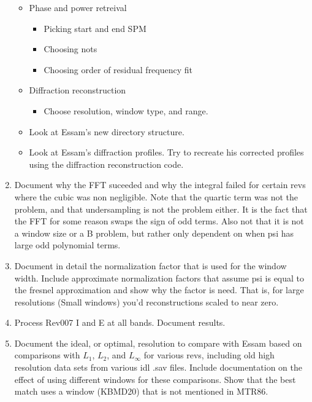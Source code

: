 \documentclass[crop=false,class=article,oneside]{standalone}
\begin{document}
\begin{enumerate}
\begin{itemize}
\begin{itemize}
                \end{itemize}
                \item Phase and power retreival
                \begin{itemize}
                    \item Picking start and end SPM
                    \item Choosing nots
                    \item Choosing order of residual frequency fit
                \end{itemize}
                \item Diffraction reconstruction
                \begin{itemize}
                    \item Choose resolution, window type, and range.
                \end{itemize}
                \item Look at Essam's new directory structure.
                \item Look at Essam's diffraction profiles. Try to recreate his corrected profiles using the diffraction reconstruction code.
            \end{itemize}
            \item Document why the FFT suceeded and why the integral failed for certain revs where the cubic was non negligible. Note that the quartic term was not the problem, and that undersampling is not the problem either. It is the fact that the FFT for some reason swaps the sign of odd terms. Also not that it is not a window size or a B problem, but rather only dependent on when psi has large odd polynomial terms.
            \item Document in detail the normalization factor that is used for the window width. Include approximate normalization factors that assume psi is equal to the fresnel approximation and show why the factor is need. That is, for large resolutions (Small windows) you'd reconstructions scaled to near zero.
            \item Process Rev007 I and E at all bands. Document results.
            \item Document the ideal, or optimal, resolution to compare with Essam based on comparisons with $L_{1}$, $L_{2}$, and $L_{\infty}$ for various revs, including old high resolution data sets from various idl .sav files. Include documentation on the effect of using different windows for these comparisons. Show that the best match uses a window (KBMD20) that is not mentioned in MTR86.
        \end{enumerate}
\end{document}
